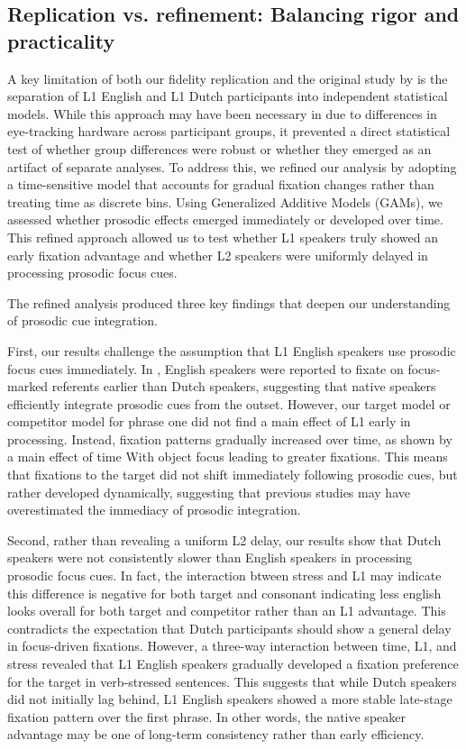 \subsection{Replication vs. refinement: Balancing rigor and practicality}

A key limitation of both our fidelity replication and the original study by \citep{Ge2021} is the separation of L1 English and L1 Dutch participants into independent statistical models. While this approach may have been necessary in \citep{Ge2021} due to differences in eye-tracking hardware across participant groups, it prevented a direct statistical test of whether group differences were robust or whether they emerged as an artifact of separate analyses. To address this, we refined our analysis by adopting a time-sensitive model that accounts for gradual fixation changes rather than treating time as discrete bins. Using Generalized Additive Models (GAMs), we assessed whether prosodic effects emerged immediately or developed over time. This refined approach allowed us to test whether L1 speakers truly showed an early fixation advantage and whether L2 speakers were uniformly delayed in processing prosodic focus cues.

The refined analysis produced three key findings that deepen our understanding of prosodic cue integration.

First, our results challenge the assumption that L1 English speakers use prosodic focus cues immediately. In \citep{Ge2021}, English speakers were reported to fixate on focus-marked referents earlier than Dutch speakers, suggesting that native speakers efficiently integrate prosodic cues from the outset. However, our target model or competitor model for phrase one did not find a main effect of L1 early in processing. Instead, fixation patterns gradually increased over time, as shown by a main effect of time With object focus leading to greater fixations. This means that fixations to the target did not shift immediately following prosodic cues, but rather developed dynamically, suggesting that previous studies may have overestimated the immediacy of prosodic integration.

Second, rather than revealing a uniform L2 delay, our results show that Dutch speakers were not consistently slower than English speakers in processing prosodic focus cues. In fact, the interaction btween stress and L1 may indicate this difference is negative for both target and consonant indicating less english looks overall for both target and competitor rather than an L1 advantage. This contradicts the expectation that Dutch participants should show a general delay in focus-driven fixations. However, a three-way interaction between time, L1, and stress revealed that L1 English speakers gradually developed a fixation preference for the target in verb-stressed sentences. This suggests that while Dutch speakers did not initially lag behind, L1 English speakers showed a more stable late-stage fixation pattern over the first phrase. In other words, the native speaker advantage may be one of long-term consistency rather than early efficiency.

